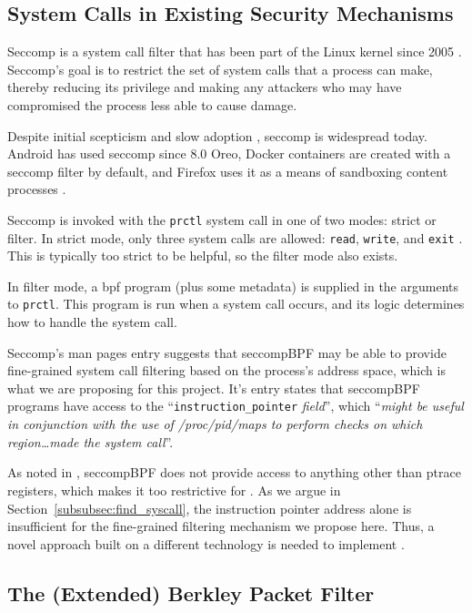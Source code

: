 \subsection{System Calls in Existing Security Mechanisms}

Seccomp is a system call filter that has been part of the Linux kernel since
2005 \cite{arcangeli_seccomp_2005}. Seccomp's goal is to restrict the set of
system calls that a process can make, thereby reducing its privilege and making
any attackers who may have compromised the process less able to cause damage.

Despite initial scepticism and slow adoption
\cite{TORVALDS_ANYONE_USES_SECCOMP}, seccomp is widespread today. Android has
used seccomp since 8.0 Oreo, Docker containers are
created with a seccomp filter by default, and Firefox uses it as a means of
sandboxing content processes \cite{android_seccomp_oreo, docker_seccomp,
firefox_seccomp}.

Seccomp is invoked with the \texttt{prctl} system call in one of two modes: strict
or filter. In strict mode, only three system calls are allowed: \texttt{read},
\texttt{write}, and \texttt{exit} \cite{MAN_PAGES_SECCOMP}. This is typically
too strict to be helpful, so the filter mode also exists.

In filter mode, a \ac{bpf} program (plus some metadata) is supplied in the arguments to
\texttt{prctl}. This program is run when a system call occurs, and its logic
determines how to handle the system call. 

Seccomp's man pages entry suggests that seccompBPF may be able to provide fine-grained
system call filtering based on the process's address space, which is what we
are proposing for this project. It's entry states that seccompBPF programs have
access to the ``\texttt{instruction\_pointer} \textit{field}'', which
``\textit{might be useful in conjunction with the use of /proc/pid/maps to
perform checks on which region\dots made the system call}''. 

As noted in
\textcite{yang2024makingsyscallprivilegeright}, seccompBPF does not provide
access to anything other than ptrace registers, which makes it too restrictive
for \af. As we argue in Section~\ref{subsubsec:find_syscall}, the instruction pointer
address alone is insufficient for the fine-grained filtering mechanism we
propose here. Thus, a novel approach built on a different technology is needed
to implement \af. 

\subsection{The (Extended) Berkley Packet Filter}\label{subsec:bgd-bpf}

